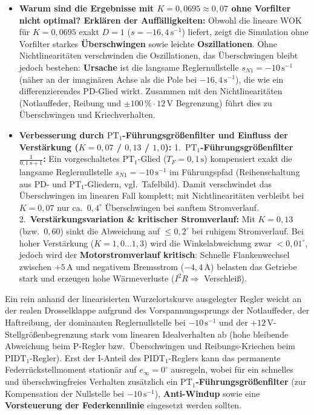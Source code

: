 \documentclass[a4paper,10pt,department=FakEI]{OTHRartcl}
\begin{document}
\begin{itemize}\setlength{\itemsep}{0.5pt}
    \item \textbf{Warum sind die Ergebnisse mit $K = 0{,}0695 \approx 0{,}07$ ohne Vorfilter nicht optimal? Erklären der Auffälligkeiten:}
    Obwohl die lineare WOK für $K = 0{,}0695$ exakt $D = 1$ ($s = -16{,}4\,\text{s}^{-1}$) liefert, zeigt die Simulation ohne Vorfilter starkes \textbf{Überschwingen} sowie leichte \textbf{Oszillationen}. Ohne Nichtlinearitäten verschwinden die Oszillationen, das Überschwingen bleibt jedoch bestehen: \textbf{Ursache} ist die langsame Reglernullstelle $s_{N1} = -10\,\text{s}^{-1}$ (näher an der imaginären Achse als die Pole bei $-16{,}4\,\text{s}^{-1}$), die wie ein differenzierendes $\text{PD}$-Glied wirkt. Zusammen mit den Nichtlinearitäten (Notlauffeder, Reibung und $\pm 100\,\% \cdot 12\,\text{V}$ Begrenzung) führt dies zu Überschwingen und Kriechverhalten.
    \item \textbf{Verbesserung durch $\text{PT}_1$-Führungsgrößenfilter und Einfluss der Verstärkung ($K = 0{,}07$ / $0{,}13$ / $1{,}0$):}
    1.~\textbf{$\text{PT}_1$-Führungsgrößenfilter $\frac{1}{0{,}1\,s + 1}$:} Ein vorgeschaltetes $\text{PT}_1$-Glied ($T_F = 0{,}1\,\text{s}$) kompensiert exakt die langsame Reglernullstelle $s_{N1} = -10\,\text{s}^{-1}$ im Führungspfad (Reihenschaltung aus $\text{PD}$- und $\text{PT}_1$-Gliedern, vgl.\ Tafelbild). Damit verschwindet das Überschwingen im linearen Fall komplett; mit Nichtlinearitäten verbleibt bei $K = 0{,}07$ nur ca.\ $0{,}4^\circ$ Überschwingen bei sanftem Stromverlauf.
    2.~\textbf{Verstärkungsvariation \& kritischer Stromverlauf:} Mit $K = 0{,}13$ (bzw.\ $0{,}60$) sinkt die Abweichung auf $\le 0{,}2^\circ$ bei ruhigem Stromverlauf. Bei hoher Verstärkung ($K = 1{,}0\dots 1{,}3$) wird die Winkelabweichung zwar $< 0{,}01^\circ$, jedoch wird der \textbf{Motorstromverlauf kritisch}: Schnelle Flankenwechsel zwischen $+5\,\text{A}$ und negativem Bremsstrom ($-4{,}4\,\text{A}$) belasten das Getriebe stark und erzeugen hohe Wärmeverluste ($I^2 R \Rightarrow$ Verschleiß).
\end{itemize}

\begin{tcolorbox}[title={\textbf{Gewonnene Erkenntnisse (1 bis 3 Sätze)}}, coltitle=white, colbacktitle=primaryBlue, top=1mm, bottom=1mm]
\footnotesize Ein rein anhand der linearisierten Wurzelortskurve ausgelegter Regler weicht an der realen Drosselklappe aufgrund des Vorspannungssprungs der Notlauffeder, der Haftreibung, der dominanten Reglernullstelle bei $-10\,\text{s}^{-1}$ und der $+12\,\text{V}$-Stellgrößenbegrenzung stark vom linearen Idealverhalten ab (hohe bleibende Abweichung beim P-Regler bzw.\ Überschwingen und Reibungs-Kriechen beim $\text{PIDT}_1$-Regler). Erst der I-Anteil des $\text{PIDT}_1$-Reglers kann das permanente Federrückstellmoment stationär auf $e_{\infty} = 0^\circ$ ausregeln, wobei für ein schnelles und überschwingfreies Verhalten zusätzlich ein \textbf{$\text{PT}_1$-Führungsgrößenfilter} (zur Kompensation der Nullstelle bei $-10\,\text{s}^{-1}$), \textbf{Anti-Windup} sowie eine \textbf{Vorsteuerung der Federkennlinie} eingesetzt werden sollten.
\end{tcolorbox}
\end{document}
